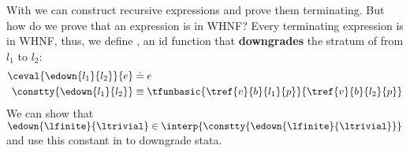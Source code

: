 %
With \etfix{\tau} we can construct recursive expressions
and prove them terminating.
%
But how do we prove that an expression is in WHNF?
%
Every terminating expression is in WHNF, 
thus, we define , an id function that 
\textbf{downgrades} the stratum of from $l_1$ to $l_2$:
%
\begin{align*}
\ceval{\edown{l_1}{l_2}}{e} &\doteq e\\
\constty{\edown{l_1}{l_2}} & \equiv 
\tfunbasic{\tref{v}{b}{l_1}{p}}{\tref{v}{b}{l_2}{p}}
\end{align*}
We can show that $\edown{\lfinite}{\ltrivial} 
\in \interp{\constty{\edown{\lfinite}{\ltrivial}}}$
and use this constant in \undeclang to downgrade stata.
